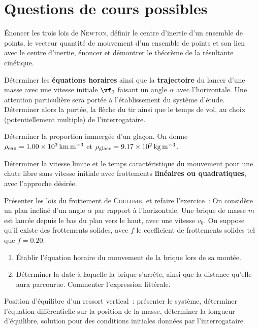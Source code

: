 \documentclass[a4paper, 10pt, final, garamond]{book}
\begin{document}
\newpage
\section{Questions de cours possibles}
\begin{enumerate}
	\litem{17pt}{\strr}%
	Énoncer les trois lois de \textsc{Newton}, définir le centre d'inertie
	d'un ensemble de points, le vecteur quantité de mouvement d'un
	ensemble de points et son lien avec le centre d'inertie, énoncer et
	démontrer le théorème de la résultante cinétique.

	\litem{17pt}{\strrr}%
	Déterminer les \textbf{équations horaires} ainsi que la
	\textbf{trajectoire} du lancer d'une masse avec une vitesse initiale
	$\vf_0$ faisant un angle $\alpha$ avec l'horizontale. Une attention
	particulière sera portée à l'établissement du système d'étude.
	Déterminer alors la portée, la flèche du tir ainsi que le temps de vol,
	au choix (potentiellement multiple) de l'interrogataire.

	\litem{17pt}{\str}%
	Déterminer la proportion immergée d'un glaçon. On donne $\rho_{\rm
			eau} = \SI{1.00e3}{km.m^{-3}}$ et $\rho_{\rm glace} =
		\SI{9.17e2}{kg.m^{-3}}$.

	\litem{17pt}{\strr}%
	Déterminer la vitesse limite et le temps caractéristique du
	mouvement pour une chute libre sans vitesse initiale avec frottements
	\textbf{linéaires ou quadratiques}, avec l'approche désirée.

	\litem{17pt}{\strr}%
	Présenter les lois du frottement de \textsc{Coulomb}, et refaire
	l'exercice~:
	\smallbreak
	On considère un plan incliné d'un angle $\alpha$ par
	rapport à l'horizontale. Une brique de masse $m$ est
	lancée depuis le bas du plan vers le haut, avec une vitesse $v_0$.
	On suppose qu'il existe des frottements solides,
	avec $f$ le coefficient de frottements solides tel que $f =
		\num{0.20}$.
	\begin{enumerate}[label=\sqenumi]
		\item Établir l'équation horaire du mouvement de la brique lors de
		      sa montée.
		\item Déterminer la date à laquelle la brique s'arrête, ainsi que la
		      distance qu'elle aura parcourue. Commenter l'expression littérale.
	\end{enumerate}
	\litem{17pt}{\strr}%
	Position d'équilibre d'un ressort vertical~: présenter le système,
	déterminer l'équation différentielle sur la position de la masse,
	déterminer la longueur d'équilibre, solution pour des conditions
	initiales données par l'interrogataire.
\end{enumerate}
\end{document}
